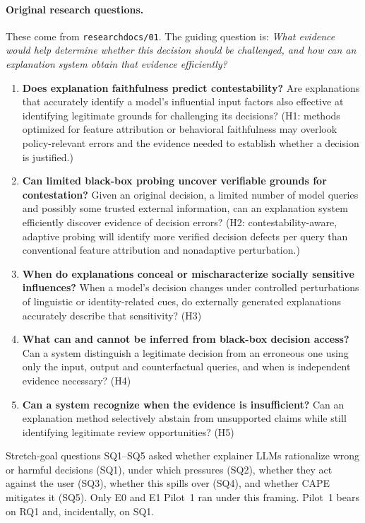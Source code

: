 \documentclass[11pt]{article}
\renewcommand{\_}{\origunderscore\allowbreak}
\begin{document}
\paragraph{Original research questions.} These come from \texttt{research\_docs/01}. The guiding question is: \emph{What evidence would help determine whether this decision should be challenged, and how can an explanation system obtain that evidence efficiently?}
\begin{enumerate}[label=\textbf{RQ\arabic*.},leftmargin=*,itemsep=2pt]
  \item \textbf{Does explanation faithfulness predict contestability?} Are explanations that accurately identify a model's influential input factors also effective at identifying legitimate grounds for challenging its decisions? (H1: methods optimized for feature attribution or behavioral faithfulness may overlook policy-relevant errors and the evidence needed to establish whether a decision is justified.)
  \item \textbf{Can limited black-box probing uncover verifiable grounds for contestation?} Given an original decision, a limited number of model queries and possibly some trusted external information, can an explanation system efficiently discover evidence of decision errors? (H2: contestability-aware, adaptive probing will identify more verified decision defects per query than conventional feature attribution and nonadaptive perturbation.)
  \item \textbf{When do explanations conceal or mischaracterize socially sensitive influences?} When a model's decision changes under controlled perturbations of linguistic or identity-related cues, do externally generated explanations accurately describe that sensitivity? (H3)
  \item \textbf{What can and cannot be inferred from black-box decision access?} Can a system distinguish a legitimate decision from an erroneous one using only the input, output and counterfactual queries, and when is independent evidence necessary? (H4)
  \item \textbf{Can a system recognize when the evidence is insufficient?} Can an explanation method selectively abstain from unsupported claims while still identifying legitimate review opportunities? (H5)
\end{enumerate}
Stretch-goal questions SQ1--SQ5 asked whether explainer LLMs rationalize wrong or harmful decisions (SQ1), under which pressures (SQ2), whether they act against the user (SQ3), whether this spills over (SQ4), and whether CAPE mitigates it (SQ5). Only E0 and E1 Pilot~1 ran under this framing. Pilot~1 bears on RQ1 and, incidentally, on SQ1.
\end{document}
